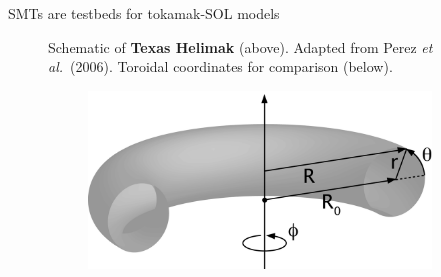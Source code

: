 \documentclass[12pt,table]{beamer}
\newcommand{\etal}{\emph{et al.}}
\begin{document}
\begin{frame}{SMTs are testbeds for tokamak-SOL models}
\begin{minipage}[t]{0.5\linewidth}
\begin{figure}
        \tiny Schematic of \textbf{Texas Helimak} (above). Adapted from Perez \etal\ (2006). Toroidal coordinates for comparison (below). 
        \hfill
        \begin{figure}
            \centering
        \includegraphics[width=.6\linewidth]{figs/Toroidal_coordinates.png}
        \end{figure}
    \end{figure}
    \hfill
    \end{minipage}%
\end{frame}

\end{document}
